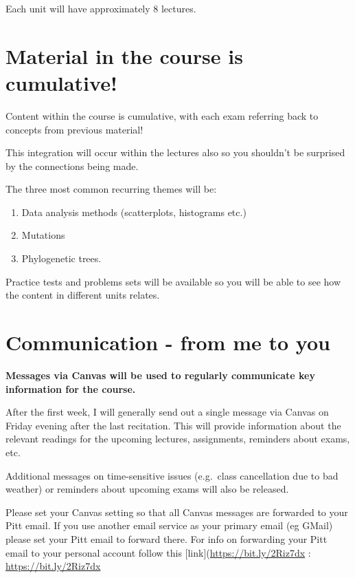 \documentclass[
]{book}
\providecommand{\tightlist}{%
  \setlength{\itemsep}{0pt}\setlength{\parskip}{0pt}}
\begin{document}
Each unit will have approximately 8 lectures.

\hypertarget{material-in-the-course-is-cumulative}{%
\chapter{Material in the course is cumulative!}\label{material-in-the-course-is-cumulative}}

Content within the course is cumulative, with each exam referring back to concepts from previous material!

This integration will occur within the lectures also so you shouldn't be surprised by the connections being made.

The three most common recurring themes will be:

\begin{enumerate}
\def\labelenumi{\arabic{enumi}.}
\tightlist
\item
  Data analysis methods (scatterplots, histograms etc.)
\item
  Mutations
\item
  Phylogenetic trees.
\end{enumerate}

Practice tests and problems sets will be available so you will be able to see how the content in different units relates.

\hypertarget{communication---from-me-to-you}{%
\chapter{Communication - from me to you}\label{communication---from-me-to-you}}

\textbf{Messages via Canvas will be used to regularly communicate key information for the course.}

After the first week, I will generally send out a single message via Canvas on Friday evening after the last recitation. This will provide information about the relevant readings for the upcoming lectures, assignments, reminders about exams, etc.

Additional messages on time-sensitive issues (e.g.~class cancellation due to bad weather) or reminders about upcoming exams will also be released.

Please set your Canvas setting so that all Canvas messages are forwarded to your Pitt email. If you use another email service as your primary email (eg GMail) please set your Pitt email to forward there.
For info on forwarding your Pitt email to your personal account follow this {[}link{]}(\url{https://bit.ly/2Riz7dx} : \url{https://bit.ly/2Riz7dx}
\end{document}
